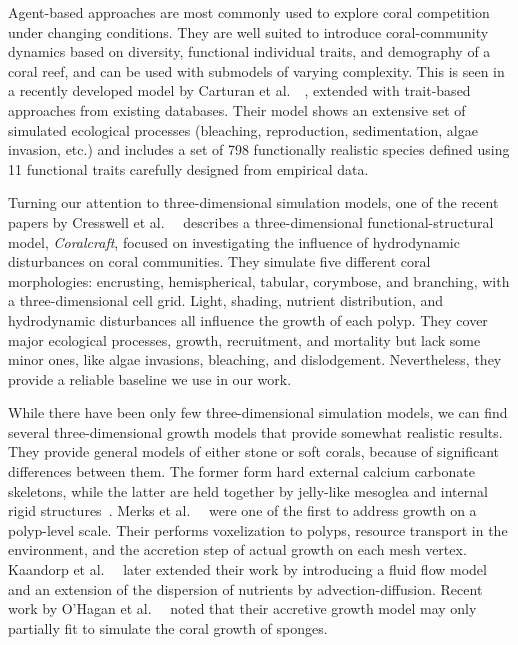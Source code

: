 \documentclass[9pt]{pnas-new}
\renewcommand{\etal}{et al.\ }
\newcommand{\etc}{etc.}
\begin{document}
Agent-based approaches are most commonly used to explore coral competition under changing conditions. They are well suited to introduce coral-community dynamics based on diversity, functional individual traits, and demography of a coral reef, and can be used with submodels of varying complexity. This is seen in a recently developed model by Carturan \etal~\cite{coral_community_main}, extended with trait-based approaches from existing databases. Their model shows an extensive set of simulated ecological processes (bleaching, reproduction, sedimentation, algae invasion, \etc) and includes a set of 798 functionally realistic species defined using 11 functional traits carefully designed from empirical data.

Turning our attention to three-dimensional simulation models, one of the recent papers by Cresswell \etal~\cite{coral_community_3D} describes a three-dimensional functional-structural model, \textit{Coralcraft}, focused on investigating the influence of hydrodynamic disturbances on coral communities. They simulate five different coral morphologies: encrusting, hemispherical, tabular, corymbose, and branching, with a three-dimensional cell grid. Light, shading, nutrient distribution, and hydrodynamic disturbances all influence the growth of each polyp. They cover major ecological processes, growth, recruitment, and mortality but lack some minor ones, like algae invasions, bleaching, and dislodgement. Nevertheless, they provide a reliable baseline we use in our work.

While there have been only few three-dimensional simulation models, we can find several three-dimensional growth models that provide somewhat realistic results. They provide general models of either stone or soft corals, because of significant differences between them. The former form hard external calcium carbonate skeletons, while the latter are held together by jelly-like mesoglea and internal rigid structures~\cite{corals_book_1983}. Merks \etal~\cite{polyp_growth} were one of the first to address growth on a polyp-level scale. Their performs voxelization to polyps, resource transport in the environment, and the accretion step of actual growth on each mesh vertex. Kaandorp \etal~\cite{Kaandorp_2013} later extended their work by introducing a fluid flow model and an extension of the dispersion of nutrients by advection-diffusion. Recent work by O'Hagan \etal~\cite{sponge_growth} noted that their accretive growth model may only partially fit to simulate the coral growth of sponges. 
\end{document}
